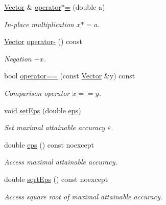 \begin{DoxyCompactItemize}
\hyperlink{classSpacy_1_1FEniCS_1_1Vector}{Vector} \& \hyperlink{classSpacy_1_1SupportedOperatorBase_a15adabb20b53d84a79982b0668a67f68_a15adabb20b53d84a79982b0668a67f68}{operator$\ast$=} (double a)
\begin{DoxyCompactList}\small\item\em In-\/place multiplication $ x*=a$. \end{DoxyCompactList}\item 
\hyperlink{classSpacy_1_1FEniCS_1_1Vector}{Vector} \hyperlink{classSpacy_1_1SupportedOperatorBase_a0adcaddc24efbbdccbd891df99971c6c_a0adcaddc24efbbdccbd891df99971c6c}{operator-\/} () const
\begin{DoxyCompactList}\small\item\em Negation $ -x$. \end{DoxyCompactList}\item 
bool \hyperlink{classSpacy_1_1SupportedOperatorBase_aa493a6ea82feb3480a1c83395a0a7c3a_aa493a6ea82feb3480a1c83395a0a7c3a}{operator==} (const \hyperlink{classSpacy_1_1FEniCS_1_1Vector}{Vector} \&y) const
\begin{DoxyCompactList}\small\item\em Comparison operator $ x==y$. \end{DoxyCompactList}\item 
void \hyperlink{classSpacy_1_1Mixin_1_1Eps_a1bbfd62541610d5d80f2782ab77158e4_a1bbfd62541610d5d80f2782ab77158e4}{set\+Eps} (double \hyperlink{classSpacy_1_1Mixin_1_1Eps_a40e2ba8f3abd2b5370ef41238cfaaf8b_a40e2ba8f3abd2b5370ef41238cfaaf8b}{eps})
\begin{DoxyCompactList}\small\item\em Set maximal attainable accuracy $\varepsilon$. \end{DoxyCompactList}\item 
double \hyperlink{classSpacy_1_1Mixin_1_1Eps_a40e2ba8f3abd2b5370ef41238cfaaf8b_a40e2ba8f3abd2b5370ef41238cfaaf8b}{eps} () const noexcept
\begin{DoxyCompactList}\small\item\em Access maximal attainable accuracy. \end{DoxyCompactList}\item 
double \hyperlink{classSpacy_1_1Mixin_1_1Eps_a29e8c25dc3f1fdede57b8eb06f520fe1_a29e8c25dc3f1fdede57b8eb06f520fe1}{sqrt\+Eps} () const noexcept
\begin{DoxyCompactList}\small\item\em Access square root of maximal attainable accuracy. \end{DoxyCompactList}\item 

\end{DoxyCompactItemize}

